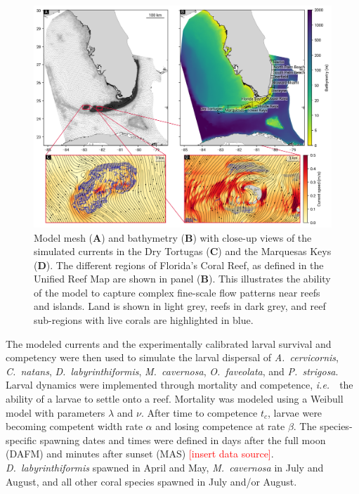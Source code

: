 \documentclass[preprint,12pt,authoryear]{elsarticle}
\newcommand{\ie}{{\it i.e.}\ }
\begin{document}
\begin{figure}
    \centering
    \includegraphics[width=\textwidth]{figures/fig_mesh_tnc.png}
    \caption{Model mesh (\textbf{A}) and bathymetry (\textbf{B}) with close-up views of the simulated currents in the Dry Tortugas (\textbf{C}) and the Marquesas Keys (\textbf{D}). The different regions of Florida's Coral Reef, as defined in the Unified Reef Map are shown in panel (\textbf{B}). This illustrates the ability of the model to capture complex fine-scale flow patterns near reefs and islands. Land is shown in light grey, reefs in dark grey, and reef sub-regions with live corals are highlighted in blue.}
    \label{fig:mesh}
\end{figure}
The modeled currents and the experimentally calibrated larval survival and competency were then used to simulate the larval dispersal of \textit{A.~cervicornis}, \textit{C.~natans}, \textit{D.~labyrinthiformis}, \textit{M.~cavernosa}, \textit{O.~faveolata}, and \textit{P.~strigosa}.  Larval dynamics were implemented through mortality and competence, \ie~the ability of a larvae to settle onto a reef. Mortality was modeled using a Weibull model \citep{king2023larval} with parameters $\lambda$ and $\nu$. After time to competence $t_c$, larvae were becoming competent width rate $\alpha$ and losing competence at rate $\beta$. The species-specific spawning dates and times were defined in days after the full moon (DAFM) and minutes after sunset (MAS) \textcolor{red}{[insert data source]}. \textit{D.~labyrinthiformis} spawned in April and May, \textit{M.~cavernosa} in July and August, and all other coral species spawned in July and/or August.
\end{document}

